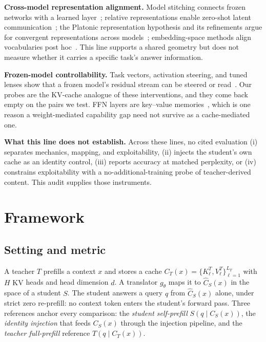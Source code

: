 \documentclass{article} %
\newcommand{\kv}{\ensuremath{\mathrm{KV}}}
\begin{document}
\textbf{Cross-model representation alignment.} Model stitching connects frozen
networks with a learned layer~\citep{stitching2021}; relative representations
enable zero-shot latent communication~\citep{relrep2022}; the Platonic
representation hypothesis and its refinements argue for convergent
representations across models~\citep{platonic2024,perfectplatonic2025,aristotelian2026};
embedding-space methods align vocabularies post hoc~\citep{vec2vec2025}. This
line supports a shared geometry but does not measure whether it carries a
specific task's answer information.

\textbf{Frozen-model controllability.} Task vectors, activation steering, and
tuned lenses show that a frozen model's residual stream can be steered or
read~\citep{taskvectors2023,actsteer2024,tunedlens2023,gist2023}. Our probes are
the \kv{}-cache analogue of these interventions, and they come back empty on the
pairs we test. FFN layers are key--value memories~\citep{ffnmemory2021}, which is
one reason a weight-mediated capability gap need not survive as a cache-mediated
one.

\textbf{What this line does not establish.} Across these lines, no cited
evaluation (i) separates mechanics, mapping, and exploitability, (ii) injects
the student's own cache as an identity control, (iii) reports accuracy at
matched perplexity, or (iv) constrains exploitability with a
no-additional-training probe of teacher-derived content. This audit supplies those instruments.


\section{Framework}
\label{sec:framework}

\subsection{Setting and metric}
A teacher $T$ prefills a context $x$ and stores a cache
$C_T(x)=\{K^T_\ell,V^T_\ell\}_{\ell=1}^{L_T}$ with $H$ \kv{} heads and head
dimension $d$. A translator $g_\theta$ maps it to $\widehat C_S(x)$ in the space
of a student $S$. The student answers a query $q$ from
$\widehat C_S(x)$ alone, under strict zero re-prefill: no context token enters
the student's forward pass. Three references anchor every comparison: the
\emph{student self-prefill} $S(q\mid C_S(x))$, the \emph{identity injection}
that feeds $C_S(x)$ through the injection pipeline, and the \emph{teacher
full-prefill} reference $T(q\mid C_T(x))$.
\end{document}
